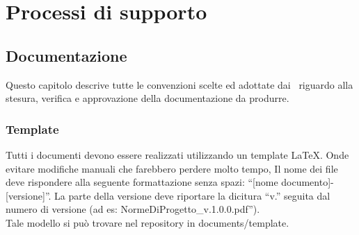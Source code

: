 \section{Processi di supporto}{

\subsection{Documentazione}{
Questo capitolo descrive tutte le convenzioni scelte ed adottate dai \gruppo\ riguardo alla stesura, verifica e approvazione della documentazione da produrre.
\subsubsection{Template} 
		Tutti i documenti devono essere realizzati utilizzando un template \LaTeX. Onde evitare modifiche manuali che farebbero perdere molto tempo, 
		Il nome dei file deve rispondere alla seguente formattazione senza spazi: “[nome documento]-[versione]”. La parte della versione deve riportare la dicitura “v.” seguita dal numero di versione (ad es: NormeDiProgetto\_v.1.0.0.pdf”).\\
 		Tale modello si può trovare nel repository in documents/template.
	\label{sec:docs}
}}
